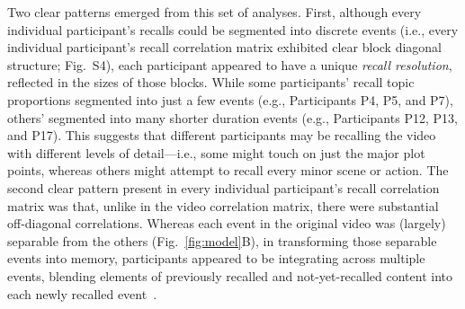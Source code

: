 \documentclass{article}
\newcommand{\corrmats}{S4}
\begin{document}
Two clear patterns emerged from this set of analyses.  First, although every individual participant's recalls could be segmented into discrete events (i.e., every individual participant's recall correlation matrix exhibited clear block diagonal structure; Fig.~\corrmats), each participant appeared to have a unique \textit{recall resolution}, reflected in the sizes of those blocks.  While some participants' recall topic proportions segmented into just a few events (e.g., Participants P4, P5, and P7), others' segmented into many shorter duration events (e.g., Participants P12, P13, and P17).  This suggests that different participants may be recalling the video with different levels of detail---i.e., some might touch on just the major plot points, whereas others might attempt to recall every minor scene or action.  The second clear pattern present in every individual participant's recall correlation matrix was that, unlike in the video correlation matrix, there were substantial off-diagonal correlations.  Whereas each event in the original video was (largely) separable from the others (Fig.~\ref{fig:model}B), in transforming those separable events into memory, participants appeared to be integrating across multiple events, blending elements of previously recalled and not-yet-recalled content into each newly recalled event~\citep[Figs.~\ref{fig:model}E, \corrmats; also see][]{MannEtal11, HowaEtal12, Mann19}.
\end{document}
